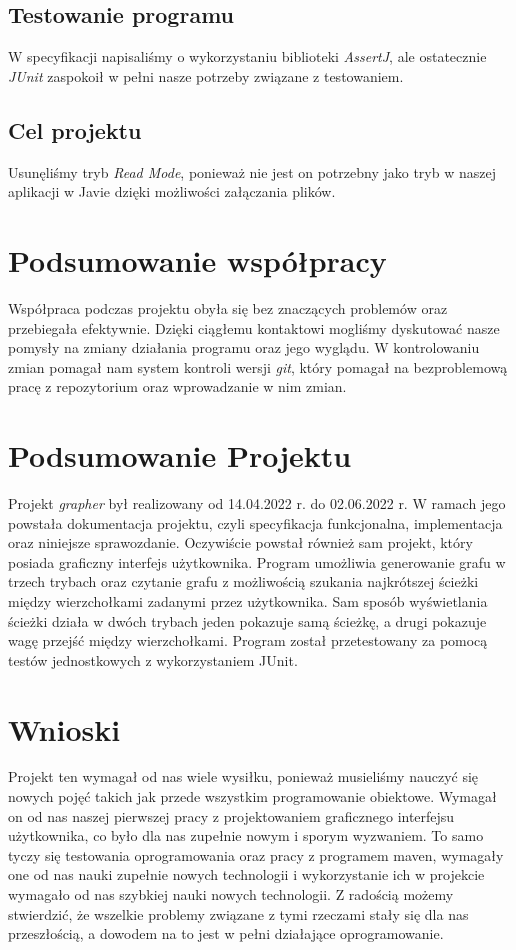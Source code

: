 \documentclass[10pt, a4paper]{report}
\begin{document}
\subsection{Testowanie programu}\label{subsec:testowanie-programu}
W specyfikacji napisaliśmy o wykorzystaniu biblioteki \textit{AssertJ}, ale
ostatecznie \textit{JUnit} zaspokoił w pełni nasze potrzeby związane
z testowaniem.

\subsection{Cel projektu}\label{subsec:cel-projektu}
Usunęliśmy tryb \textit{Read Mode}, ponieważ nie jest on potrzebny jako tryb w naszej aplikacji w Javie dzięki możliwości załączania plików.

\section{Podsumowanie współpracy}\label{sec:podsumowanie-współpracy}
Współpraca podczas projektu obyła się bez znaczących problemów oraz przebiegała
efektywnie.
Dzięki ciągłemu kontaktowi mogliśmy dyskutować nasze pomysły na zmiany
działania programu oraz jego wyglądu.
W kontrolowaniu zmian pomagał nam system kontroli wersji \textit{git}, który
pomagał na bezproblemową pracę z repozytorium oraz wprowadzanie w nim zmian.

\section{Podsumowanie Projektu}\label{sec:podsumowanie-projektu}
Projekt \textit{grapher} był realizowany od 14.04.2022 r. do 02.06.2022 r. W
ramach jego powstała dokumentacja projektu, czyli
specyfikacja funkcjonalna, implementacja oraz niniejsze sprawozdanie.
Oczywiście powstał również sam projekt, który posiada graficzny interfejs
użytkownika.
Program umożliwia generowanie grafu w trzech trybach oraz czytanie grafu z
możliwością szukania najkrótszej ścieżki między wierzchołkami zadanymi przez
użytkownika.
Sam sposób wyświetlania ścieżki działa w dwóch trybach jeden pokazuje samą
ścieżkę, a drugi pokazuje wagę przejść między wierzchołkami. Program został
przetestowany za pomocą testów
jednostkowych z wykorzystaniem JUnit.

\section{Wnioski}\label{sec:wnioski}
Projekt ten wymagał od nas wiele wysiłku, ponieważ musieliśmy nauczyć się
nowych pojęć takich jak przede wszystkim
programowanie obiektowe. Wymagał on od nas naszej pierwszej pracy z
projektowaniem graficznego interfejsu użytkownika, co było dla nas zupełnie
nowym i sporym wyzwaniem.
To samo tyczy się testowania oprogramowania oraz pracy z programem maven,
wymagały one od nas nauki zupełnie nowych technologii i wykorzystanie ich w
projekcie wymagało od nas
szybkiej nauki nowych technologii. Z radością możemy stwierdzić, że wszelkie
problemy związane z tymi rzeczami stały się dla nas przeszłością, a dowodem na
to jest w pełni działające
oprogramowanie.
\end{document}
